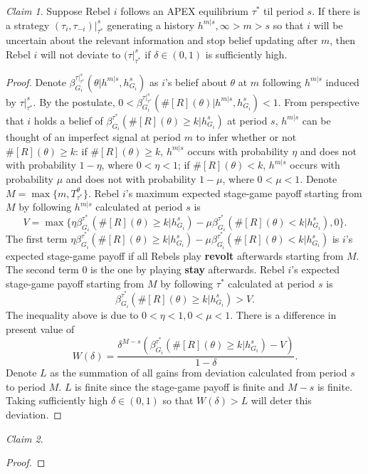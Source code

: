 \documentclass[12pt,letter]{article}
\theoremstyle{definition}
\theoremstyle{remark}
\theoremstyle{claim}
\newtheorem{claim}{Claim}
\begin{document}
\begin{claim}
Suppose Rebel $i$ follows an APEX equilibrium $\tau^{*}$ til period $s$. If there is a strategy $(\tau_i,\tau_{-i})|^s_{\tau^{*}}$  generating a history $h^{m|s}, \infty>m>s$ so that $i$ will be uncertain about the relevant information and stop belief updating after $m$, then Rebel $i$ will not deviate to $(\tau|^s_{\tau^{*}}$ if $\delta\in(0,1)$ is sufficiently high.
\end{claim}
\begin{proof}
Denote $\beta^{\tau|^s_{\tau^{*}}}_{G_i}(\theta|h^{m|s}, h^s_{G_i})$ as $i$'s belief about $\theta$ at $m$ following $h^{m|s}$ induced by $\tau|^s_{\tau^{*}}$. By the postulate,  $0<\beta^{\tau|^s_{\tau^{*}}}_{G_i}(\#[R](\theta)|h^{m|s}, h^s_{G_i})<1$. From perspective that $i$ holds a belief of $\beta^{\tau^{*}}_{G_i}(\#[R](\theta)\geq k|h^s_{G_i})$ at period $s$, $h^{m|s}$ can be thought of an imperfect signal at period $m$ to infer whether or not $\#[R](\theta)\geq k$: if $\#[R](\theta)\geq k$, $h^{m|s}$ occurs with probability $\eta$ and does not with probability $1-\eta$, where $0<\eta<1$; if $\#[R](\theta)< k$, $h^{m|s}$ occurs with probability $\mu$ and does not with probability $1-\mu$, where $0<\mu<1$. Denote $M=\max\{m, T^{\theta}_{\tau^{*}}\}$. Rebel $i$'s maximum expected stage-game payoff starting from $M$ by following $h^{m|s}$ calculated at period $s$ is 
\[V=\max\{\eta\beta^{\tau^{*}}_{G_i}(\#[R](\theta)\geq k|h^s_{G_i})-\mu\beta^{\tau^{*}}_{G_i}(\#[R](\theta)< k|h^s_{G_i}),0\}.\]
The first term $\eta\beta^{\tau^{*}}_{G_i}(\#[R](\theta)\geq k|h^s_{G_i})-\mu\beta^{\tau^{*}}_{G_i}(\#[R](\theta)< k|h^s_{G_i})$ is $i$'s expected stage-game payoff if all Rebels play \textbf{revolt} afterwards starting from $M$.  The second term $0$ is the one by playing \textbf{stay} afterwards. Rebel $i$'s expected stage-game payoff starting from $M$ by following $\tau^{*}$ calculated at period $s$ is 
\[\beta^{\tau^{*}}_{G_i}(\#[R](\theta)\geq k|h^s_{G_i})>V.\]
The inequality above is due to $0<\eta<1,0<\mu<1$. There is a difference in present value of
\[W(\delta)=\frac{\delta^{M-s}(\beta^{\tau^{*}}_{G_i}(\#[R](\theta)\geq k|h^s_{G_i})-V)}{1-\delta}.\]
Denote $L$ as the summation of all gains from deviation calculated from period $s$ to period $M$. $L$ is finite since the stage-game payoff is finite and $M-s$ is finite. Taking sufficiently high $\delta\in(0,1)$ so that $W(\delta)>L$ will deter this deviation.
\end{proof}

\begin{claim}
\end{claim}
\begin{proof}
\end{proof}
\end{document}

